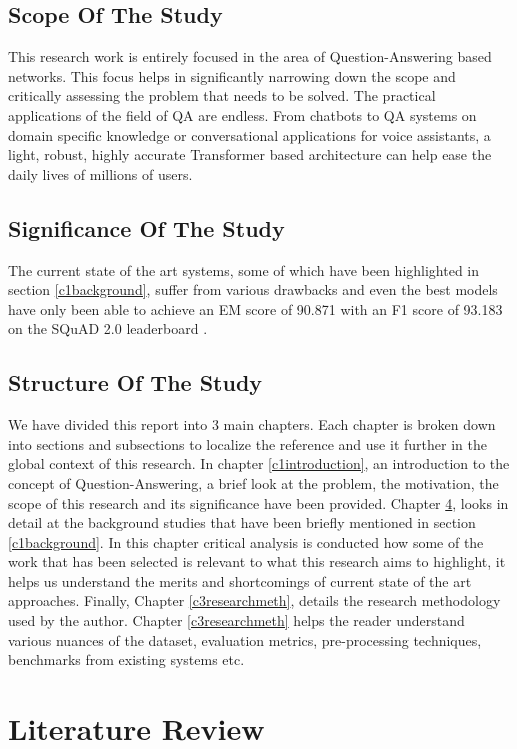 \documentclass[12pt]{report}
\begin{document}
        \section{Scope Of The Study}\label{13}

        This research work is entirely focused in the area of Question-Answering based networks. This focus helps in significantly narrowing down the scope and critically assessing the problem that needs to be solved. The practical applications of the field of QA are endless. From chatbots to QA systems on domain specific knowledge or conversational applications for voice assistants, a light, robust, highly accurate Transformer based architecture can help ease the daily lives of millions of users.
        \section{Significance Of The Study}\label{14}

        The current state of the art systems, some of which have been highlighted in section \ref{c1background}, suffer from various drawbacks and even the best models have only been able to achieve an EM score of 90.871 with an F1 score of 93.183 on the SQuAD 2.0 leaderboard \cite{squad}.
        \section{Structure Of The Study}\label{15}
           We have divided this report into 3 main chapters. Each chapter is broken down into sections and subsections to localize the reference and use it further in the global context of this research. In chapter \ref{c1introduction}, an introduction to the concept of Question-Answering, a brief look at the problem, the motivation, the scope of this research and its significance have been provided. Chapter \ref{c2litrev}, looks in detail at the background studies that have been briefly mentioned in section \ref{c1background}. In this chapter critical analysis is conducted how some of the work that has been selected is relevant to what this research aims to highlight, it helps us understand the merits and shortcomings of current state of the art approaches. Finally, Chapter \ref{c3researchmeth}, details the research methodology used by the author. Chapter \ref{c3researchmeth} helps the reader understand various nuances of the dataset, evaluation metrics, pre-processing techniques, benchmarks from existing systems etc.

    \chapter{\centering Literature Review}\label{c2litrev}
\end{document}
